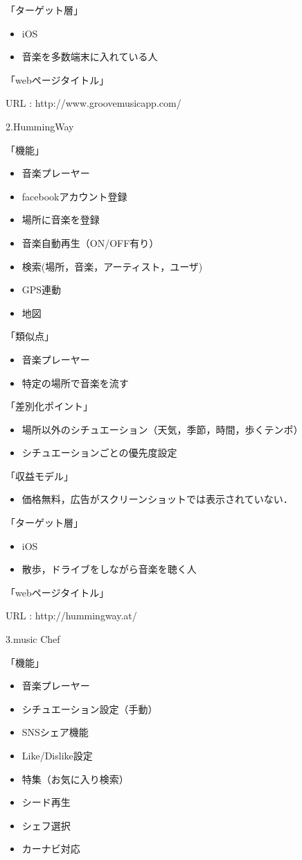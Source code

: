 「ターゲット層」
\begin{itemize}
\item iOS
\item 音楽を多数端末に入れている人
\end{itemize}
「webページタイトル」
\par
URL : http://www.groovemusicapp.com/
\\
\par
2.HummingWay
\par
「機能」
\begin{itemize}
\item 音楽プレーヤー
\item facebookアカウント登録
\item 場所に音楽を登録
\item 音楽自動再生（ON/OFF有り）
\item 検索(場所，音楽，アーティスト，ユーザ)
\item GPS連動
\item 地図
\end{itemize}

「類似点」
\begin{itemize}
\item 音楽プレーヤー
\item 特定の場所で音楽を流す
\end{itemize}

「差別化ポイント」
\begin{itemize}
\item 場所以外のシチュエーション（天気，季節，時間，歩くテンポ）
\item シチュエーションごとの優先度設定
\end{itemize}

「収益モデル」
\begin{itemize}
\item 価格無料，広告がスクリーンショットでは表示されていない．
\end{itemize}

「ターゲット層」
\begin{itemize}
\item iOS
\item 散歩，ドライブをしながら音楽を聴く人
\end{itemize}
「webページタイトル」
\par
URL : http://hummingway.at/
\\
\par
3.music Chef
\par
「機能」
\begin{itemize}
\item 音楽プレーヤー
\item シチュエーション設定（手動）
\item SNSシェア機能
\item Like/Dislike設定
\item 特集（お気に入り検索）
\item シード再生
\item シェフ選択
\item カーナビ対応
\end{itemize}

